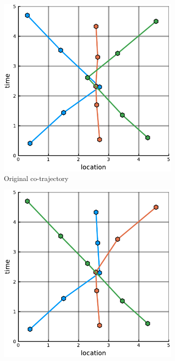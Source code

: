 \documentclass[12pt]{article}
\theoremstyle{definition}
\begin{document}
\begin{figure}
    \centering
    \begin{subfigure}[t]{0.3\textwidth}
      \includegraphics[width=\textwidth]{graph_swap-a.pdf}
      \caption{Original co-trajectory}
      \label{fig:graph-swap-a}
    \end{subfigure}
    \begin{subfigure}[t]{0.3\textwidth}
      \includegraphics[width=\textwidth]{graph_swap-b.pdf}

\end{subfigure}
\end{figure}
\end{document}
